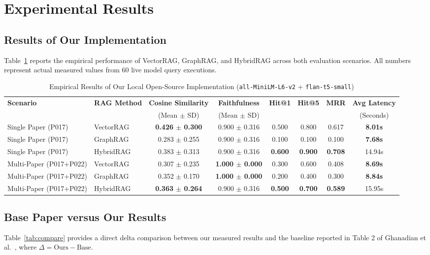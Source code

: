 \documentclass[conference]{IEEEtran}
\begin{document}
\section{Experimental Results}

\subsection{Results of Our Implementation}
Table~\ref{tab:ours} reports the empirical performance of VectorRAG, GraphRAG, and HybridRAG across both evaluation scenarios. All numbers represent actual measured values from 60 live model query executions.

\begin{table}[t]
\caption{Empirical Results of Our Local Open-Source Implementation (\texttt{all-MiniLM-L6-v2} + \texttt{flan-t5-small})}
\label{tab:ours}
\centering
\small
\begin{tabular}{llcccccc}
\toprule
\textbf{Scenario} & \textbf{RAG Method} & \textbf{Cosine Similarity} & \textbf{Faithfulness} & \textbf{Hit@1} & \textbf{Hit@5} & \textbf{MRR} & \textbf{Avg Latency} \\
& & (Mean $\pm$ SD) & (Mean $\pm$ SD) & & & & (Seconds) \\
\midrule
Single Paper (P017) & VectorRAG & \textbf{0.426 $\pm$ 0.300} & 0.900 $\pm$ 0.316 & 0.500 & 0.800 & 0.617 & \textbf{8.01s} \\
Single Paper (P017) & GraphRAG  & 0.283 $\pm$ 0.255 & 0.900 $\pm$ 0.316 & 0.100 & 0.100 & 0.100 & \textbf{7.68s} \\
Single Paper (P017) & HybridRAG & 0.383 $\pm$ 0.313 & 0.900 $\pm$ 0.316 & \textbf{0.600} & \textbf{0.900} & \textbf{0.708} & 14.94s \\
\midrule
Multi-Paper (P017+P022) & VectorRAG & 0.307 $\pm$ 0.235 & \textbf{1.000 $\pm$ 0.000} & 0.300 & 0.600 & 0.408 & \textbf{8.69s} \\
Multi-Paper (P017+P022) & GraphRAG  & 0.352 $\pm$ 0.170 & \textbf{1.000 $\pm$ 0.000} & 0.200 & 0.400 & 0.300 & \textbf{8.84s} \\
Multi-Paper (P017+P022) & HybridRAG & \textbf{0.363 $\pm$ 0.264} & 0.900 $\pm$ 0.316 & \textbf{0.500} & \textbf{0.700} & \textbf{0.589} & 15.95s \\
\bottomrule
\end{tabular}
\end{table}

\subsection{Base Paper versus Our Results}
Table~\ref{tab:compare} provides a direct delta comparison between our measured results and the baseline reported in Table 2 of Ghanadian et al.\ \cite{ghanadian2026base}, where $\Delta = \text{Ours} - \text{Base}$.
\end{document}
